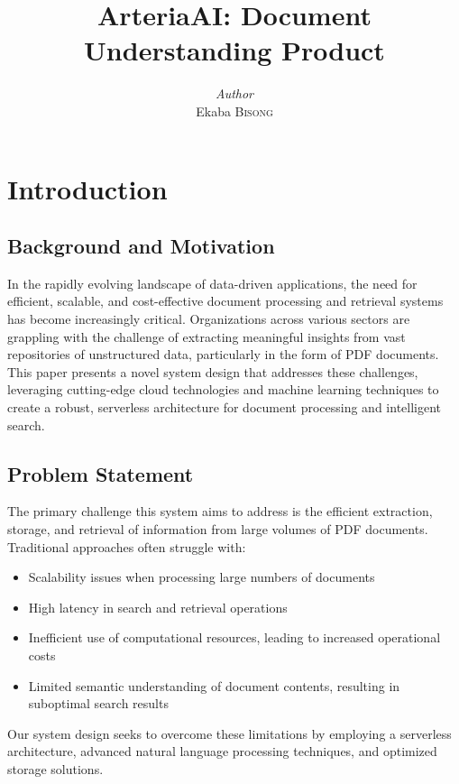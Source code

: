 \documentclass[a4paper, 12pt]{report}
\title{ArteriaAI: Document Understanding Product}
\author{\textit{Author}\\Ekaba \textsc{Bisong}}
\date{}
\begin{document}
\maketitle
\romantableofcontents



\chapter{Introduction}

\section{Background and Motivation}
In the rapidly evolving landscape of data-driven applications, the need for efficient, scalable, and cost-effective document processing and retrieval systems has become increasingly critical. Organizations across various sectors are grappling with the challenge of extracting meaningful insights from vast repositories of unstructured data, particularly in the form of PDF documents. This paper presents a novel system design that addresses these challenges, leveraging cutting-edge cloud technologies and machine learning techniques to create a robust, serverless architecture for document processing and intelligent search.

\section{Problem Statement}
The primary challenge this system aims to address is the efficient extraction, storage, and retrieval of information from large volumes of PDF documents. Traditional approaches often struggle with:
\begin{itemize}
    \item Scalability issues when processing large numbers of documents
    \item High latency in search and retrieval operations
    \item Inefficient use of computational resources, leading to increased operational costs
    \item Limited semantic understanding of document contents, resulting in suboptimal search results
\end{itemize}
Our system design seeks to overcome these limitations by employing a serverless architecture, advanced natural language processing techniques, and optimized storage solutions.
\end{document}
